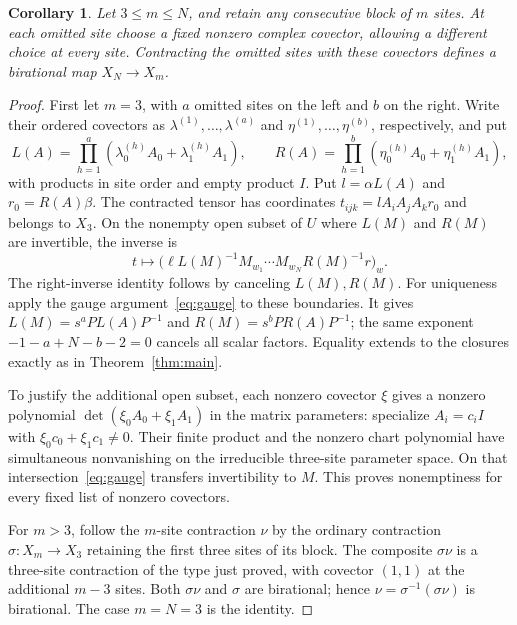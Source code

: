 \documentclass[11pt]{article}
\newtheorem{corollary}{Corollary}
\begin{document}
\begin{corollary}\label{cor:weighted}
Let $3\leq m\leq N$, and retain any consecutive block of $m$ sites.
At each omitted site choose a fixed nonzero complex covector, allowing a
different choice at every site. Contracting the omitted sites with these
covectors defines a birational map $X_N\to X_m$.
\end{corollary}
\begin{proof}
First let $m=3$, with $a$ omitted sites on the left and $b$ on the right.
Write their ordered covectors as $\lambda^{(1)},\ldots,\lambda^{(a)}$
and $\eta^{(1)},\ldots,\eta^{(b)}$, respectively, and put
\[
 L(A)=\prod_{h=1}^a(\lambda^{(h)}_0A_0+\lambda^{(h)}_1A_1),\qquad
 R(A)=\prod_{h=1}^b(\eta^{(h)}_0A_0+\eta^{(h)}_1A_1),
\]
with products in site order and empty product $I$. Put $l=\alpha L(A)$ and
$r_0=R(A)\beta$. The contracted tensor has coordinates $t_{ijk}=lA_iA_jA_kr_0$
and belongs to $X_3$.
On the nonempty open subset of $U$ where $L(M)$ and $R(M)$ are invertible,
the inverse is
\begin{equation}\label{eq:weighted-inverse}
 t\longmapsto\bigl(\ell L(M)^{-1}M_{w_1}\cdots M_{w_N}R(M)^{-1}r\bigr)_w.
\end{equation}
The right-inverse identity follows by canceling $L(M),R(M)$.
For uniqueness apply the gauge argument~\eqref{eq:gauge} to these boundaries.
It gives
$L(M)=s^aPL(A)P^{-1}$ and $R(M)=s^bPR(A)P^{-1}$;
the same exponent $-1-a+N-b-2=0$ cancels all scalar factors.
Equality extends to the closures exactly as in Theorem~\ref{thm:main}.

To justify the additional open subset, each nonzero covector $\xi$ gives a
nonzero polynomial $\det(\xi_0A_0+\xi_1A_1)$ in the matrix parameters:
specialize $A_i=c_iI$ with $\xi_0c_0+\xi_1c_1\ne0$.
Their finite product and the nonzero chart polynomial have simultaneous
nonvanishing on the irreducible three-site parameter space. On that
intersection~\eqref{eq:gauge} transfers invertibility to $M$.
This proves nonemptiness for every fixed list of nonzero covectors.

For $m>3$, follow the $m$-site contraction $\nu$ by the ordinary contraction
$\sigma:X_m\to X_3$ retaining the first three sites of its block.
The composite $\sigma\nu$ is a three-site contraction of the type just proved,
with covector $(1,1)$ at the additional $m-3$ sites. Both $\sigma\nu$ and
$\sigma$ are birational; hence $\nu=\sigma^{-1}(\sigma\nu)$ is birational.
The case $m=N=3$ is the identity.
\end{proof}
\end{document}
